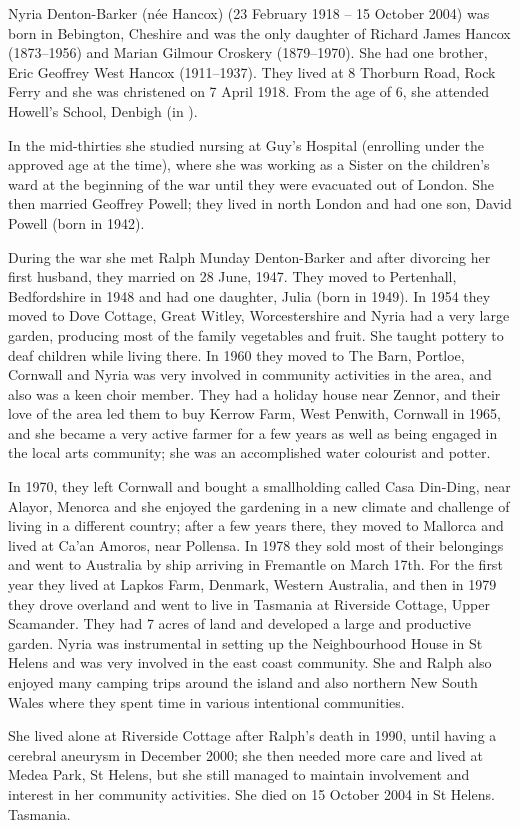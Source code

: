 
Nyria Denton-Barker (n\'{e}e Hancox) (23 February 1918 -- 15 October 2004) was born in Bebington, Cheshire\cite{BMDIndex_JoanNyriaHancox_birth} and was the only daughter of Richard James Hancox (1873--1956) and Marian Gilmour Croskery (1879--1970).\cite{NyriaBirth} She had one brother, Eric Geoffrey West Hancox (1911--1937).  They lived at 8 Thorburn Road, Rock Ferry and she was christened on 7 April 1918.\cite{NyriaChristening}
From the age of 6, she attended Howell's School, Denbigh (in ).\cite{OralHistoryJDB2008}

In the mid-thirties she studied nursing at Guy's Hospital (enrolling under the approved age at the time),  where she was working  as a Sister on the children's ward at the beginning of the war until they were evacuated out of London. She then married Geoffrey Powell; they lived in north London and had one son, David Powell (born in 1942).

During the war she met Ralph Munday Denton-Barker and after divorcing her first husband, they married on 28 June, 1947.\cite{MarriageCertRalphDentonBarkerJoanNyriaPowell}
They moved to Pertenhall, Bedfordshire in 1948 and had one daughter, Julia (born in 1949).  In 1954 they moved to Dove Cottage, Great Witley, Worcestershire and Nyria had a very large garden, producing most of the family vegetables and fruit. She taught pottery to deaf children while living there.  In 1960 they moved to The Barn, Portloe, Cornwall and Nyria was very involved in community activities in the area, and also was a keen choir member.  They had a holiday house near Zennor, and their love of the area led them to buy Kerrow Farm, West Penwith, Cornwall in 1965,  and she became a very active farmer for a few years as well as being engaged in the local arts community; she was an accomplished water colourist and potter.

In 1970, they left Cornwall and  bought a smallholding called Casa Din-Ding, near Alayor, Menorca and she enjoyed the gardening in  a new climate and challenge of living in a different country;  after a few years there, they moved to Mallorca and lived at Ca'an Amoros, near Pollensa.  
In 1978 they sold most of their belongings and went to Australia by ship arriving in Fremantle on March 17th.  For the first year they lived at Lapkos Farm, Denmark, Western Australia, and then in 1979 they drove overland and went to live in Tasmania at Riverside Cottage, Upper Scamander. They had 7 acres of land and developed a large and productive garden. Nyria was instrumental in setting up the Neighbourhood House in St Helens and was very involved in the east coast community.  She and Ralph also enjoyed many camping trips around the island and also northern New South Wales where they spent time in various intentional communities. 

She lived alone at Riverside Cottage after Ralph's death in 1990, until having a cerebral aneurysm in December 2000;  she then needed more care and lived at Medea Park, St Helens, but she still managed to maintain involvement and interest in her community activities.  She  died on 15 October 2004 in St Helens. Tasmania.

